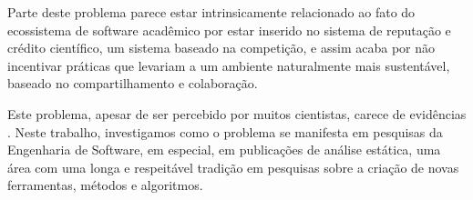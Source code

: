 


Parte deste problema parece estar intrinsicamente relacionado ao fato do
ecossistema de software acadêmico por estar inserido no sistema de reputação e
crédito científico, um sistema baseado na competição, e assim acaba por não
incentivar práticas que levariam a um ambiente naturalmente mais sustentável,
baseado no compartilhamento e colaboração.

Este problema, apesar de ser percebido por muitos cientistas, carece de
evidências \cite{howison2015understanding}. Neste trabalho, investigamos como
o problema se manifesta em pesquisas da Engenharia de Software, em especial, em
publicações de análise estática, uma área com uma longa e respeitável tradição
em pesquisas sobre a criação de novas ferramentas, métodos e algoritmos.





